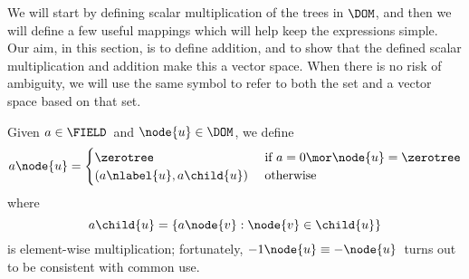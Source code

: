 We will start by defining scalar multiplication of the trees in
$\DOM$, and then we will define a few useful mappings which will help
keep the expressions simple. Our aim, in this section, is to define
addition, and to show that the defined scalar multiplication and
addition make this a vector space. When there is no risk of ambiguity,
we will use the same symbol to refer to both the set and
a vector space based on that set.

\begin{definition}\label{scalarmultiplication}
  Given $a \in \FIELD$\ and $\node{u} \in \DOM$, we
  define
  \begin{align*}
    a \node{u} = \begin{cases}
      \zerotree  & \text{ if } a = 0 \mor \node{u} = \zerotree \\
      (a \nlabel{u}, a\child{u}) & \text{ otherwise }
    \end{cases}
  \end{align*}
  where \[a\child{u} = \{a \node{v}: \node{v}\in\child{u}\}\] is
  element-wise multiplication; fortunately,  $-1 \node{u} \equiv
  -\node{u}$\ turns out to be consistent with common use.
\end{definition}





